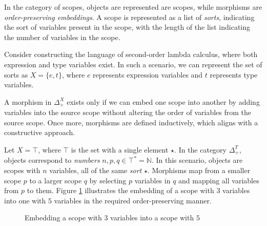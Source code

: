 \documentclass[runningheads]{llncs}
\begin{document}
In the category of scopes, objects are represented are scopes, while morphisms are \emph{order-preserving embeddings}. 
A scope is represented as a list of \emph{sorts}, indicating the sort of variables present in the scope, with the length of the list indicating the number of variables in the scope.

\begin{example}
  Consider constructing the language of second-order lambda calculus, where both expression and type variables exist. 
  In such a scenario, we can represent the set of sorts as $X = \{e, t\}$, where $e$ represents expression variables and $t$ represents type variables.
\end{example}  

A morphism in $Δ_+^X$ exists only if we can embed one scope into another by adding variables into the source scope without altering the order of variables from the source scope. 
Once more, morphisms are defined inductively, which aligns with a constructive approach.

\begin{example}
  Let $X = ⊤$, where $⊤$ is the set with a single element $⋆$. In the category $Δ_+^T$, objects correspond to \emph{numbers} $n, p, q ∈ ⊤^* = ℕ$. 
  In this scenario, objects are scopes with $n$ variables, all of the same \emph{sort} $⋆$. 
  Morphisms map from a smaller scope $p$ to a larger scope $q$ by selecting $p$ variables in $q$ and mapping all variables from $p$ to them.
  Figure \ref{fig:ex1} illustrates the embedding of a scope with $3$ variables into one with $5$ variables in the required order-preserving manner.
  \begin{figure}[]
    \centering
    \caption{Embedding a scope with $3$ variables into a scope with $5$}
    \label{fig:ex1}
  \end{figure}
\end{example}
\end{document}
